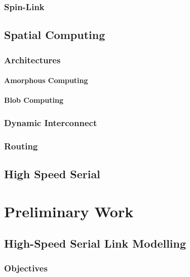 \documentclass[a4paper,11pt,titlepage]{report}
\begin{document}
			\subsection{Spin-Link}
		
		\section{Spatial Computing}
			
			\subsection{Architectures}
				
				\subsubsection{Amorphous Computing}
				
				\subsubsection{Blob Computing}
			
			\subsection{Dynamic Interconnect}
			
			\subsection{Routing}
			
		\section{High Speed Serial}
	
	
	
	\chapter{Preliminary Work}
		
		\section{High-Speed Serial Link Modelling}
			
			\subsection{Objectives}
		
\end{document}
